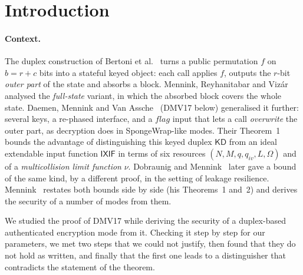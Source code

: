 \documentclass[11pt,a4paper]{article}
\theoremstyle{definition}
\theoremstyle{remark}
\newcommand{\KD}{\mathsf{KD}}
\newcommand{\IXIF}{\mathsf{IXIF}}
\newcommand{\flag}{\mathit{flag}}
\begin{document}
\section{Introduction}

\paragraph{Context.}
The duplex construction of Bertoni et al.~\cite{BDPV11} turns a public permutation $f$ on $b = r + c$ bits into a
stateful keyed object: each call applies $f$, outputs the $r$-bit \emph{outer part} of the state and absorbs a
block. Mennink, Reyhanitabar and Viz\'ar~\cite{MRV15} analysed the \emph{full-state} variant, in which the absorbed
block covers the whole state. Daemen, Mennink and Van Assche~\cite{DMV17} (DMV17 below) generalised it further: several
keys, a re-phased interface, and a $\flag$ input that lets a call \emph{overwrite} the outer part, as decryption
does in SpongeWrap-like modes. Their Theorem~1 bounds the advantage of distinguishing this keyed duplex $\KD$ from
an ideal extendable input function $\IXIF$ in terms of six resources $(N, M, q, q_{iv}, L, \Omega)$ and of a
\emph{multicollision limit function} $\nu$. Dobraunig and Mennink~\cite{DM19} later gave a bound of the same kind, by a
different proof, in the setting of leakage resilience. Mennink~\cite{Men23} restates both bounds side by side
(his Theorems~1 and~2) and derives the security of a number of modes from them.

We studied the proof of DMV17 while deriving the security of a duplex-based authenticated encryption mode from it.
Checking it step by step for our parameters, we met two steps that we could not justify, then found that they do
not hold as written, and finally that the first one leads to a distinguisher that contradicts the statement of the
theorem.
\end{document}
